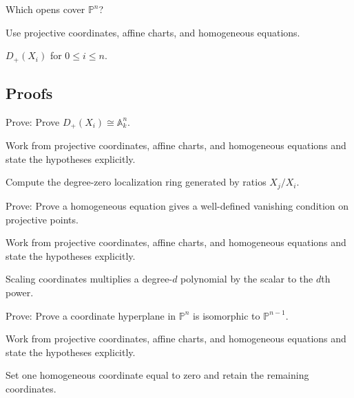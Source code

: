 \begin{exercise}\label{exr:vi36-expand-05}
Which opens cover $\mathbb P^n$?
\end{exercise}
\begin{hint}
Use projective coordinates, affine charts, and homogeneous equations.
\end{hint}
\begin{solution}
$D_+(X_i)$ for $0\le i\le n$.
\end{solution}

\subsection*{Proofs}

\begin{exercise}\label{exr:vi36-expand-06}
Prove: Prove $D_+(X_i)\cong\mathbb A^n_k$.
\end{exercise}
\begin{hint}
Work from projective coordinates, affine charts, and homogeneous equations and state the hypotheses explicitly.
\end{hint}
\begin{solution}
Compute the degree-zero localization ring generated by ratios $X_j/X_i$.
\end{solution}

\begin{exercise}\label{exr:vi36-expand-07}
Prove: Prove a homogeneous equation gives a well-defined vanishing condition on projective points.
\end{exercise}
\begin{hint}
Work from projective coordinates, affine charts, and homogeneous equations and state the hypotheses explicitly.
\end{hint}
\begin{solution}
Scaling coordinates multiplies a degree-$d$ polynomial by the scalar to the $d$th power.
\end{solution}

\begin{exercise}\label{exr:vi36-expand-08}
Prove: Prove a coordinate hyperplane in $\mathbb P^n$ is isomorphic to $\mathbb P^{n-1}$.
\end{exercise}
\begin{hint}
Work from projective coordinates, affine charts, and homogeneous equations and state the hypotheses explicitly.
\end{hint}
\begin{solution}
Set one homogeneous coordinate equal to zero and retain the remaining coordinates.
\end{solution}

